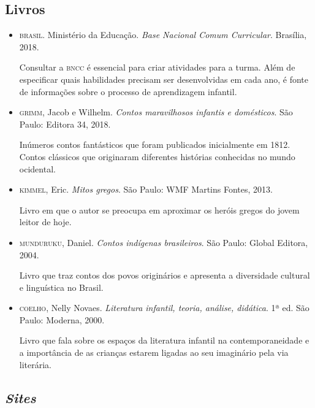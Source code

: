 \documentclass[11pt]{extarticle}
\begin{document}
\subsection{Livros}

\begin{itemize}
\item \textsc{brasil}. Ministério da Educação. \textit{Base Nacional Comum Curricular}. Brasília, 2018.

Consultar a \textsc{bncc} é essencial para criar atividades para a turma. Além de especificar quais habilidades precisam ser desenvolvidas em cada ano, é fonte de informações sobre o processo de aprendizagem infantil. 
 
 \item \textsc{grimm}, Jacob e Wilhelm. \textit{Contos maravilhosos infantis e domésticos}. São Paulo: Editora 34, 2018.

Inúmeros contos fantásticos que foram publicados inicialmente em 1812. Contos clássicos que originaram diferentes histórias conhecidas no mundo ocidental.

\item \textsc{kimmel}, Eric. \textit{Mitos gregos}. São Paulo: WMF Martins Fontes, 2013.

Livro em que o autor se preocupa em aproximar os heróis gregos do jovem leitor de hoje.

\item \textsc{munduruku}, Daniel. \textit{Contos indígenas brasileiros}. São Paulo: Global Editora, 2004.

Livro que traz contos dos povos originários e apresenta a diversidade cultural e linguística no Brasil.

\item \textsc{coelho}, Nelly Novaes. \textit{Literatura infantil, teoria, análise, didática}. 1ª ed. São Paulo: Moderna, 2000.

Livro que fala sobre os espaços da literatura infantil na contemporaneidade e a importância de as crianças estarem ligadas ao seu imaginário pela via literária.

\end{itemize}

\subsection{\textit{Sites}}
\end{document}

